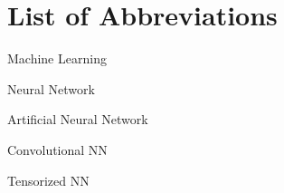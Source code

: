 \section{List of Abbreviations}

\begin{description}[leftmargin=!,labelwidth=2cm]
    \item [ML] Machine Learning
    \item [NN] Neural Network
    \item [ANN] Artificial Neural Network
    \item [CNN] Convolutional NN
    \item [TNN] Tensorized NN

\end{description}
